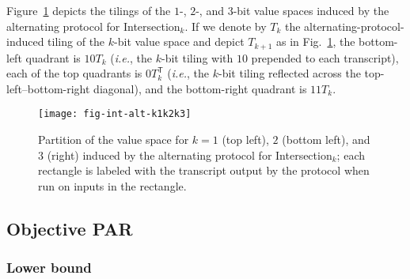 \documentclass{article}
\theoremstyle{theorem}
\theoremstyle{definition}
\theoremstyle{remark}
\newcommand{\ie}{\emph{i.e.}}
\newcommand{\intersection}{{\sc In\-ter\-sec\-tion}\ensuremath{_k}}
\begin{document}
Figure~\ref{fig:int-alt-k1k2k3} depicts the tilings of the $1$-, $2$-, and $3$-bit value spaces induced by the alternating protocol for \intersection.  If we denote by $T_k$ the alternating-protocol-induced tiling of the $k$-bit value space and depict $T_{k+1}$ as in Fig.~\ref{fig:int-alt-k1k2k3}, the bottom-left quadrant is $10T_k$ (\ie, the $k$-bit tiling with $10$ prepended to each transcript), each of the top quadrants is $0T_{k}^\mathsf{T}$ (\ie, the $k$-bit tiling reflected across the top-left--bottom-right diagonal), and the bottom-right quadrant is $11T_k$.
\begin{figure}[htp]
\begin{center}
\texttt{[image: fig-int-alt-k1k2k3]}
\caption{Partition of the value space for $k=1$ (top left), $2$ (bottom left), and $3$ (right) induced by the alternating protocol for \intersection; each rectangle is labeled with the transcript output by the protocol when run on inputs in the rectangle.}\label{fig:int-alt-k1k2k3}
\end{center}
\end{figure}


\subsection{Objective PAR}

\subsubsection{Lower bound}
\end{document}
